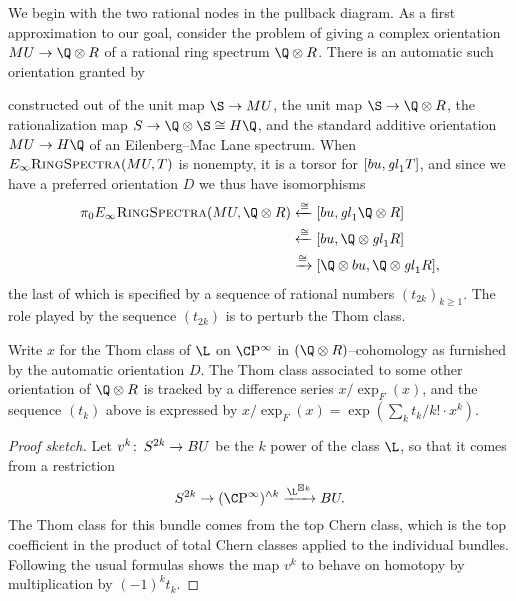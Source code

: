 We begin with the two rational nodes in the pullback diagram.  As a first approximation to our goal, consider the problem of giving a complex orientation $MU \to \Q \otimes R$ of a rational ring spectrum $\Q \otimes R$.  There is an automatic such orientation granted by
\begin{center}
\end{center}
constructed out of the unit map $\S \to MU$, the unit map $\S \to \Q \otimes R$, the rationalization map $S \to \Q \otimes \S \cong H\Q$, and the standard additive orientation $MU \to H\Q$ of an Eilenberg--Mac Lane spectrum.  When $E_\infty\normalfont\textsc{RingSpectra}(MU, T)$ is nonempty, it is a torsor for $[bu, \mathit{gl}_1 T]$, and since we have a preferred orientation $D$ we thus have isomorphisms
\begin{align*}
\pi_0 \EinftyRings(MU, \Q \otimes R) & \xleftarrow{\cong} [bu, \gl_1 \Q \otimes R] \\
& \xleftarrow{\cong} [bu, \Q \otimes \gl_1 R] \\
&\xrightarrow{\cong} [\Q \otimes bu, \Q \otimes \gl_1 R],
\end{align*}
the last of which is specified by a sequence of rational numbers $(t_{2k})_{k \ge 1}$.  The role played by the sequence $(t_{2k})$ is to perturb the Thom class.

\begin{lemma}
Write $x$ for the Thom class of $\L$ on $\CP^\infty$ in $(\Q \otimes R)$--cohomology as furnished by the automatic orientation $D$.  The Thom class associated to some other orientation of $\Q \otimes R$ is tracked by a difference series $x / \exp_F(x)$, and the sequence $(t_k)$ above is expressed by $x / \exp_F(x) = \exp(\sum_k t_k/k! \cdot x^k)$.
\end{lemma}
\begin{proof}[Proof sketch]
Let $v^k\colon\thinspace S^{2k} \to BU$ be the $k${\th} power of the class $\L$, so that it comes from a restriction \[S^{2k} \to (\CP^\infty)^{\sm k} \xrightarrow{\L^{\boxtimes k}} BU.\]  The Thom class for this bundle comes from the top Chern class, which is the top coefficient in the product of total Chern classes applied to the individual bundles.  Following the usual formulas shows the map $v^k$ to behave on homotopy by multiplication by $(-1)^k t_k$.
\end{proof}


